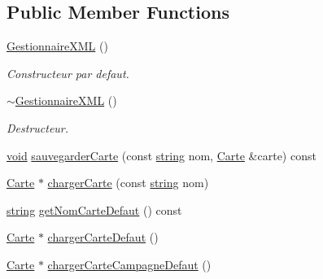 \subsection*{Public Member Functions}
\begin{DoxyCompactItemize}
\item 
\hyperlink{group__inf2990_ga267eebe0e3bb95b5d5f973a4319fe1da}{Gestionnaire\-X\-M\-L} ()
\begin{DoxyCompactList}\small\item\em Constructeur par defaut. \end{DoxyCompactList}\item 
\hyperlink{group__inf2990_gad8207e0a0791170d9c30e81be160ec73}{$\sim$\-Gestionnaire\-X\-M\-L} ()
\begin{DoxyCompactList}\small\item\em Destructeur. \end{DoxyCompactList}\item 
\hyperlink{wglew_8h_aeea6e3dfae3acf232096f57d2d57f084}{void} \hyperlink{group__inf2990_ga84f9d09636d2edbbeb398da22274741d}{sauvegarder\-Carte} (const \hyperlink{glew_8h_ae84541b4f3d8e1ea24ec0f466a8c568b}{string} nom, \hyperlink{class_carte}{Carte} \&carte) const 
\item 
\hyperlink{class_carte}{Carte} $\ast$ \hyperlink{group__inf2990_gaed7d668fdea387603e69c90f14766f97}{charger\-Carte} (const \hyperlink{glew_8h_ae84541b4f3d8e1ea24ec0f466a8c568b}{string} nom)
\item 
\hyperlink{glew_8h_ae84541b4f3d8e1ea24ec0f466a8c568b}{string} \hyperlink{group__inf2990_ga43004d2d9e045bae88d16024594e5cf3}{get\-Nom\-Carte\-Defaut} () const 
\item 
\hyperlink{class_carte}{Carte} $\ast$ \hyperlink{group__inf2990_ga9e8d745ff895e25d5d7bdf3a79ef2341}{charger\-Carte\-Defaut} ()
\item 
\hyperlink{class_carte}{Carte} $\ast$ \hyperlink{group__inf2990_ga9a4209b0cd0a7f296aca339a495f6c01}{charger\-Carte\-Campagne\-Defaut} ()
\item 

\end{DoxyCompactItemize}
